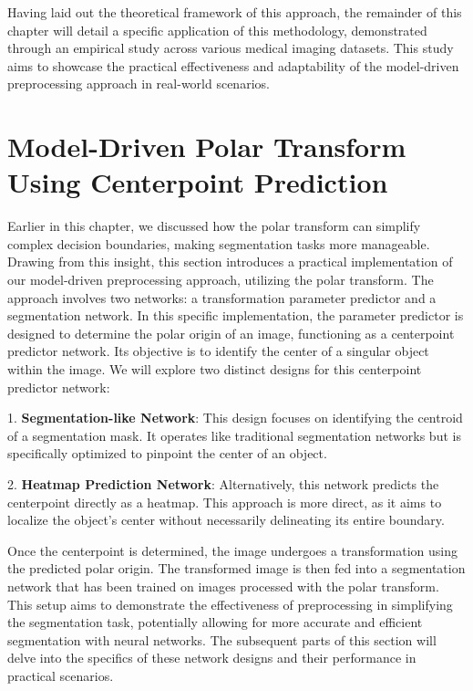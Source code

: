Having laid out the theoretical framework of this approach, the remainder of this chapter will detail a specific application of this methodology, demonstrated through an empirical study across various medical imaging datasets. This study aims to showcase the practical effectiveness and adaptability of the model-driven preprocessing approach in real-world scenarios.

\section{Model-Driven Polar Transform Using Centerpoint Prediction}
\label{polar-paper}

Earlier in this chapter, we discussed how the polar transform can simplify complex decision boundaries, making segmentation tasks more manageable. Drawing from this insight, this section introduces a practical implementation of our model-driven preprocessing approach, utilizing the polar transform. The approach involves two networks: a transformation parameter predictor and a segmentation network. In this specific implementation, the parameter predictor is designed to determine the polar origin of an image, functioning as a centerpoint predictor network. Its objective is to identify the center of a singular object within the image. We will explore two distinct designs for this centerpoint predictor network:

1. \textbf{Segmentation-like Network}: This design focuses on identifying the centroid of a segmentation mask. It operates like traditional segmentation networks but is specifically optimized to pinpoint the center of an object.

2. \textbf{Heatmap Prediction Network}: Alternatively, this network predicts the centerpoint directly as a heatmap. This approach is more direct, as it aims to localize the object's center without necessarily delineating its entire boundary.

Once the centerpoint is determined, the image undergoes a transformation using the predicted polar origin. The transformed image is then fed into a segmentation network that has been trained on images processed with the polar transform. This setup aims to demonstrate the effectiveness of preprocessing in simplifying the segmentation task, potentially allowing for more accurate and efficient segmentation with neural networks. The subsequent parts of this section will delve into the specifics of these network designs and their performance in practical scenarios.

